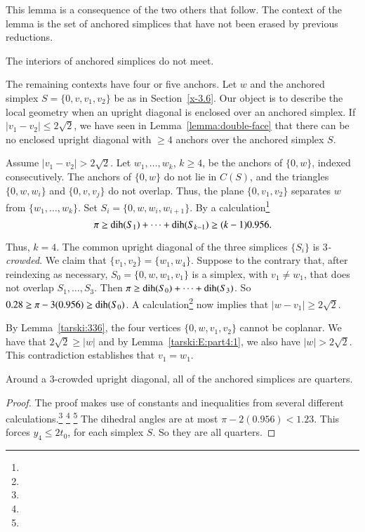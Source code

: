 This lemma is a consequence of the two others that follow. The
context of the lemma is the set of anchored simplices that have
not been erased by previous reductions.

\begin{lemma}
    \label{lemma:anchor-no-overlap}
The interiors of anchored simplices do not meet.
\end{lemma}

The remaining contexts have four or  five anchors. Let $w$ and the
anchored simplex $S=\{0,v,v_1,v_2\}$ be as in Section~\ref{x-3.6}.
Our object is to describe the local geometry when an upright
diagonal is enclosed over an anchored simplex. If $|v_1-v_2|\le
2\sqrt{2}$, we have seen in Lemma~\ref{lemma:double-face} that
there can be no enclosed upright diagonal with $\ge 4$ anchors
over the anchored simplex $S$.

Assume  $|v_1-v_2|>2\sqrt{2}$. Let $w_1,\ldots,w_k$, $k\ge4$, be the
anchors of $\{0,w\}$, indexed consecutively. The anchors of $\{0,w\}$ do not
lie in $C(S)$, and the triangles $\{0,w,w_i\}$ and $\{0,v,v_j\}$ do not
overlap. Thus, the plane $\{0,v_1,v_2\}$ separates $w$ from
$\{w_1,\ldots,w_k\}$. Set $S_i=\{0,w,w_i,w_{i+1}\}$.
By a calculation\footnote{} %
    $$\pi\ge \operatorname{dih}(S_1)+\cdots+\operatorname{dih}(S_{k-1})\ge (k-1)0.956.$$

Thus, $k=4$. The common upright diagonal  of the three simplices
$\{S_i\}$ is {\it $3$-crowded}.  We claim that
$\{v_1,v_2\}=\{w_1,w_4\}$. Suppose to the contrary that, after
reindexing as necessary, $S_0=\{0,w,w_1,v_1\}$ is a simplex, with
$v_1\ne w_1$, that does not overlap $S_1,\ldots,S_3$. Then $\pi\ge
\operatorname{dih}(S_0)+\cdots+\operatorname{dih}(S_3)$. So
    $0.28\ge \pi-3(0.956)\ge \operatorname{dih}(S_0)$.
A calculation\footnote{} %
now implies that $|w-v_1|\ge 2\sqrt{2}$.

By Lemma~\ref{tarski:336}, the four vertices
$\{0,w,v_1,v_2\}$ cannot be coplanar.
We have that $2\sqrt{2}\ge|w|$ and by Lemma~\ref{tarski:E:part4:1},
we also have $|w|>2\sqrt2$.
This contradiction establishes that $v_1=w_1$.

\begin{lemma}
Around a $3$-crowded upright diagonal, all of the anchored
simplices are quarters.
\end{lemma}

\begin{proof}  The proof makes use of constants and inequalities from
several different calculations.\footnote{} %
\footnote{} %
\footnote{} %
The dihedral angles are at most $\pi-
2(0.956) < 1.23$. This forces $y_4\le 2t_0$, for each simplex $S$.
So they are all quarters.
\end{proof}

